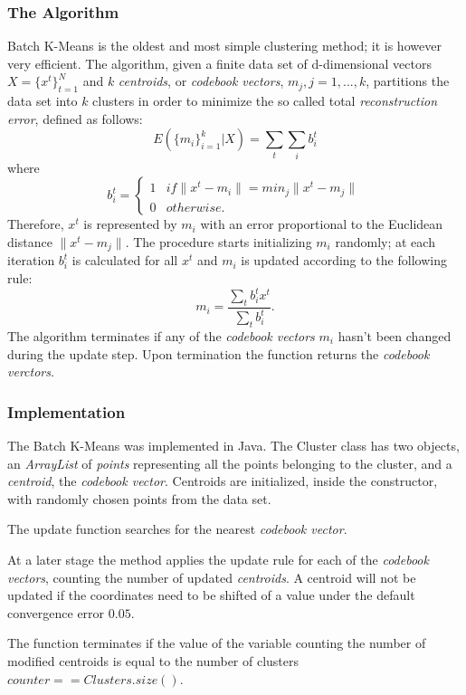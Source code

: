 \documentclass{lmproj}
\begin{document}
\subsubsection{The Algorithm}
Batch K-Means\cite{Clustering} is the oldest and most simple clustering method; it is however very efficient. The algorithm, given a finite data set of d-dimensional vectors $X=\{x^t\}_{t=1}^{N}$ and $k$ \textit{centroids}, or \textit{codebook vectors}, $m_j,j=1,...,k$, partitions the data set into $k$ clusters in order to minimize the so called total \textit{reconstruction error}, defined as follows:
\begin{equation}
E(\{m_i\}^k_{i=1}|X)=\underset{t}{\sum}\underset{i}{\sum}b_i^t
\end{equation}
where
\begin{equation}
b_i^t=
\begin{cases}
1 & if \parallel x^t -m_i \parallel = min_j \parallel x^t - m_j \parallel \\
0 & otherwise.
\end{cases}
\end{equation}
Therefore, $x^t$ is represented by $m_i$ with an error proportional to the Euclidean distance $\parallel x^t - m_j \parallel$. The procedure starts initializing $m_i$ randomly; at each iteration $b_i^t$ is calculated for all $x^t$ and $m_i$ is updated according to the following rule:
\begin{equation}
m_i=\dfrac{\sum_t b_i^t x^t}{\sum_t b_i^t}.
\end{equation}
The algorithm terminates if any of the \textit{codebook vectors} $m_i$ hasn't been changed during the update step. Upon termination the function returns the \textit{codebook verctors}.

\subsubsection{Implementation}
The Batch K-Means was implemented in Java. The Cluster class has two objects, an \textit{ArrayList} of \textit{points} representing all the points belonging to the cluster, and a \textit{centroid}, the \textit{codebook vector}.
Centroids are initialized, inside the constructor, with randomly chosen points from the data set.

The update function searches for the nearest \textit{codebook vector}.

At a later stage the method applies the update rule for each of the \textit{codebook vectors}, counting the number of updated \textit{centroids}. A centroid will not be updated if the coordinates need to be shifted of a value under the default convergence error $0.05$.

The function terminates if the value of the variable counting the number of modified centroids is equal to the number of clusters $counter == Clusters.size()$.
\end{document}
